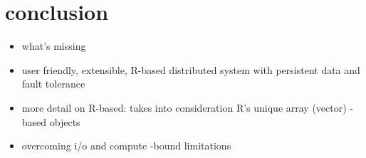 \documentclass[a4paper,10pt]{article}
\begin{document}
\section{conclusion}
\begin{itemize}
	\item what's missing
	\item user friendly, extensible, R-based distributed system with persistent data and fault tolerance
	\item more detail on R-based: takes into consideration R's unique array (vector) -based objects
	\item overcoming i/o and compute -bound limitations
\end{itemize}

\printbibliography
\end{document}
